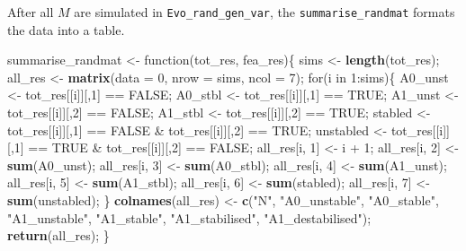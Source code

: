 \documentclass[]{article}
\newenvironment{Shaded}{\begin{snugshade}}{\end{snugshade}}
\newcommand{\KeywordTok}[1]{\textcolor[rgb]{0.13,0.29,0.53}{\textbf{{#1}}}}
\newcommand{\DataTypeTok}[1]{\textcolor[rgb]{0.13,0.29,0.53}{{#1}}}
\newcommand{\DecValTok}[1]{\textcolor[rgb]{0.00,0.00,0.81}{{#1}}}
\newcommand{\StringTok}[1]{\textcolor[rgb]{0.31,0.60,0.02}{{#1}}}
\newcommand{\OtherTok}[1]{\textcolor[rgb]{0.56,0.35,0.01}{{#1}}}
\newcommand{\NormalTok}[1]{{#1}}
\begin{document}
After all \(M\) are simulated in \texttt{Evo\_rand\_gen\_var}, the
\texttt{summarise\_randmat} formats the data into a table.

\begin{Shaded}
\begin{Highlighting}[]
\NormalTok{summarise_randmat <-}\StringTok{ }\NormalTok{function(tot_res, fea_res)\{}
    \NormalTok{sims    <-}\StringTok{ }\KeywordTok{length}\NormalTok{(tot_res);}
    \NormalTok{all_res <-}\StringTok{ }\KeywordTok{matrix}\NormalTok{(}\DataTypeTok{data =} \DecValTok{0}\NormalTok{, }\DataTypeTok{nrow =} \NormalTok{sims, }\DataTypeTok{ncol =} \DecValTok{7}\NormalTok{);}
    \NormalTok{for(i in }\DecValTok{1}\NormalTok{:sims)\{}
        \NormalTok{A0_unst   <-}\StringTok{ }\NormalTok{tot_res[[i]][,}\DecValTok{1}\NormalTok{] ==}\StringTok{ }\OtherTok{FALSE}\NormalTok{;}
        \NormalTok{A0_stbl   <-}\StringTok{ }\NormalTok{tot_res[[i]][,}\DecValTok{1}\NormalTok{] ==}\StringTok{ }\OtherTok{TRUE}\NormalTok{;}
        \NormalTok{A1_unst   <-}\StringTok{ }\NormalTok{tot_res[[i]][,}\DecValTok{2}\NormalTok{] ==}\StringTok{ }\OtherTok{FALSE}\NormalTok{;}
        \NormalTok{A1_stbl   <-}\StringTok{ }\NormalTok{tot_res[[i]][,}\DecValTok{2}\NormalTok{] ==}\StringTok{ }\OtherTok{TRUE}\NormalTok{;}
        \NormalTok{stabled   <-}\StringTok{ }\NormalTok{tot_res[[i]][,}\DecValTok{1}\NormalTok{] ==}\StringTok{ }\OtherTok{FALSE} \NormalTok{&}\StringTok{ }\NormalTok{tot_res[[i]][,}\DecValTok{2}\NormalTok{] ==}\StringTok{ }\OtherTok{TRUE}\NormalTok{;}
        \NormalTok{unstabled <-}\StringTok{ }\NormalTok{tot_res[[i]][,}\DecValTok{1}\NormalTok{] ==}\StringTok{ }\OtherTok{TRUE}  \NormalTok{&}\StringTok{ }\NormalTok{tot_res[[i]][,}\DecValTok{2}\NormalTok{] ==}\StringTok{ }\OtherTok{FALSE}\NormalTok{;}
        \NormalTok{all_res[i, }\DecValTok{1}\NormalTok{]  <-}\StringTok{ }\NormalTok{i +}\StringTok{ }\DecValTok{1}\NormalTok{;}
        \NormalTok{all_res[i, }\DecValTok{2}\NormalTok{]  <-}\StringTok{ }\KeywordTok{sum}\NormalTok{(A0_unst);}
        \NormalTok{all_res[i, }\DecValTok{3}\NormalTok{]  <-}\StringTok{ }\KeywordTok{sum}\NormalTok{(A0_stbl);}
        \NormalTok{all_res[i, }\DecValTok{4}\NormalTok{]  <-}\StringTok{ }\KeywordTok{sum}\NormalTok{(A1_unst);}
        \NormalTok{all_res[i, }\DecValTok{5}\NormalTok{]  <-}\StringTok{ }\KeywordTok{sum}\NormalTok{(A1_stbl);}
        \NormalTok{all_res[i, }\DecValTok{6}\NormalTok{]  <-}\StringTok{ }\KeywordTok{sum}\NormalTok{(stabled);}
        \NormalTok{all_res[i, }\DecValTok{7}\NormalTok{]  <-}\StringTok{ }\KeywordTok{sum}\NormalTok{(unstabled);}
    \NormalTok{\}}
    \KeywordTok{colnames}\NormalTok{(all_res) <-}\StringTok{ }\KeywordTok{c}\NormalTok{(}\StringTok{"N"}\NormalTok{, }\StringTok{"A0_unstable"}\NormalTok{, }\StringTok{"A0_stable"}\NormalTok{, }\StringTok{"A1_unstable"}\NormalTok{,}
                           \StringTok{"A1_stable"}\NormalTok{, }\StringTok{"A1_stabilised"}\NormalTok{, }\StringTok{"A1_destabilised"}\NormalTok{);}
    \KeywordTok{return}\NormalTok{(all_res);}
\NormalTok{\}}
\end{Highlighting}
\end{Shaded}
\end{document}
